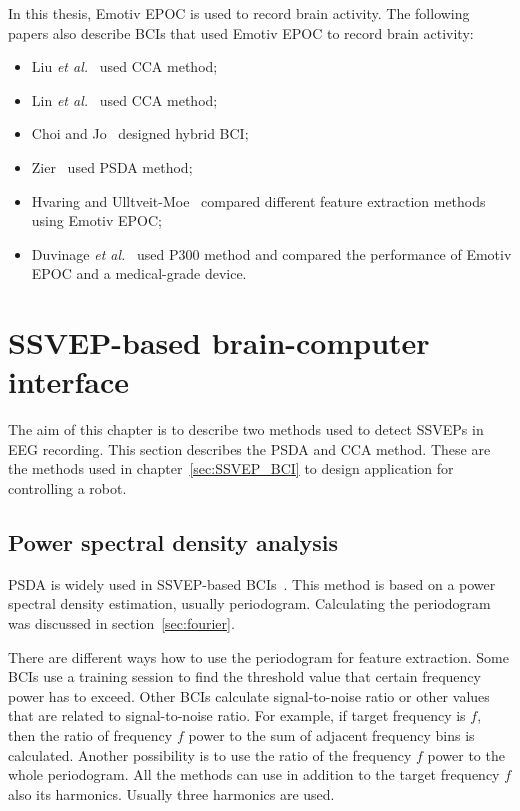 In this thesis, Emotiv EPOC is used to record brain activity. The following papers also describe \glspl{BCI} that used Emotiv EPOC to record brain activity:
\begin{itemize}
	\item Liu \textit{et al.}~\cite{emotiv_11hz} used \gls{CCA} method;
	\item Lin \textit{et al.}~\cite{emotiv_walking} used \gls{CCA} method;
	\item Choi and Jo~\cite{emotiv_hybrid} designed hybrid \gls{BCI};
	\item Zier~\cite{emotiv_psda} used \gls{PSDA} method;
	\item Hvaring and Ulltveit-Moe~\cite{emotiv_comparison} compared different \gls{feature extraction} methods using Emotiv EPOC;
	\item Duvinage \textit{et al.}~\cite{emotiv_p300_comp} used P300 method and compared the performance of Emotiv EPOC and a medical-grade device.
\end{itemize}


\section{SSVEP-based brain-computer interface}
\label{sec:SSVEP_detection}
The aim of this chapter is to describe two methods used to detect \glspl{SSVEP} in \gls{EEG} recording. 
This section describes the \gls{PSDA} and \gls{CCA} method. These are the methods used in chapter~\ref{sec:SSVEP_BCI} to design application for controlling a robot. 

\subsection{Power spectral density analysis}

\Gls{PSDA} is widely used in \gls{SSVEP}-based \glspl{BCI}~\cite{bin2009cca}. This method is based on a \gls{power spectral density} estimation, usually periodogram. Calculating the periodogram was discussed in section~\ref{sec:fourier}.

There are different ways how to use the periodogram for \gls{feature extraction}. Some \glspl{BCI} use a training session to find the threshold value that certain frequency power has to exceed. Other \glspl{BCI} calculate signal-to-noise ratio or other values that are related to signal-to-noise ratio. For example, if target frequency is $f$, then the ratio of frequency $f$ power to the sum of adjacent frequency bins is calculated. Another possibility is to use the ratio of the frequency $f$ power to the whole periodogram. All the methods can use in addition to the target frequency $f$ also its harmonics. Usually three harmonics are used.

